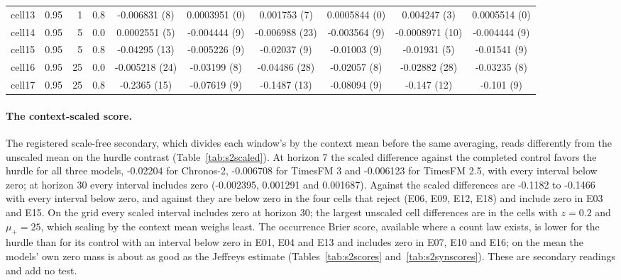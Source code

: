 \begin{table}[htbp]
\begin{tabular}{lrrrcccccc}
cell13 & 0.95 & 1 & 0.8 & -0.006831 (8) & 0.0003951 (0) & 0.001753 (7) & 0.0005844 (0) & 0.004247 (3) & 0.0005514 (0) \\
cell14 & 0.95 & 5 & 0.0 & 0.0002551 (5) & -0.004444 (9) & -0.006988 (23) & -0.003564 (9) & -0.0008971 (10) & -0.004444 (9) \\
cell15 & 0.95 & 5 & 0.8 & -0.04295 (13) & -0.005226 (9) & -0.02037 (9) & -0.01003 (9) & -0.01931 (5) & -0.01541 (9) \\
cell16 & 0.95 & 25 & 0.0 & -0.005218 (24) & -0.03199 (8) & -0.04486 (28) & -0.02057 (8) & -0.02882 (28) & -0.03235 (8) \\
cell17 & 0.95 & 25 & 0.8 & -0.2365 (15) & -0.07619 (9) & -0.1487 (13) & -0.08094 (9) & -0.147 (12) & -0.101 (9) \\
\bottomrule
\end{tabular}
\end{table}

\paragraph{The context-scaled score.} The registered scale-free secondary, which divides each window's \qs{}
by the context mean before the same averaging, reads differently from the unscaled mean on the hurdle
contrast (Table~\ref{tab:s2scaled}). At horizon 7 the scaled difference against the completed
control favors the hurdle for all three models, -0.02204 for Chronos-2, -0.006708 for TimesFM 3 and
-0.006123 for TimesFM 2.5, with every interval below zero; at horizon 30 every interval includes zero
(-0.002395, 0.001291 and 0.001687). Against \hc{} the scaled differences are -0.1182 to -0.1466 with every
interval below zero, and against \lm{} they are below zero in the four cells that reject (E06, E09, E12,
E18) and include zero in E03 and E15. On the grid every scaled interval includes zero at horizon 30; the
largest unscaled cell differences are in the cells with $z = 0.2$ and $\mu_{+} = 25$, which scaling by the
context mean weighs least. The occurrence Brier score, available where a count law exists, is lower for the
hurdle than for its control with an interval below zero in E01, E04 and E13 and includes zero in E07, E10
and E16; on the mean the models' own zero mass is about as good as the Jeffreys estimate
(Tables~\ref{tab:s2scores} and~\ref{tab:s2synscores}). These are secondary readings and add no test.

